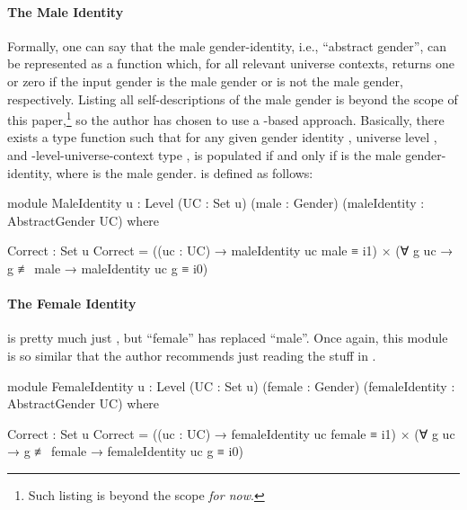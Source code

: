 \documentclass{article}
\theoremstyle{remark}
\begin{document}
\paragraph{The Male Identity}\label{sec:gender8exampleIdentityMale}
Formally, one can say that the male gender-identity, i.e., ``abstract gender'', can be represented as a function which, for all relevant universe contexts, returns one or zero if the input gender is the male gender or is not the male gender, respectively.  Listing all self-descriptions of the male gender is beyond the scope of this paper,\footnote{Such listing is beyond the scope \emph{for now}.} so the author has chosen to use a -based approach.  Basically, there exists a type function  such that for any given gender identity , universe level , and -level-universe-context type ,     is populated if and only if  is the male gender-identity, where  is the male gender.   is defined as follows:

\begin{code}
    module MaleIdentity
           {u : Level}
           (UC : Set u)
           (male : Gender)
           (maleIdentity : AbstractGender UC) where

      Correct : Set u
      Correct = ((uc : UC) → maleIdentity uc male ≡ i1)
              × (∀ g uc → g ≢ male → maleIdentity uc g ≡ i0)
\end{code}

\paragraph{The Female Identity}\label{sec:gender8exampleIdentityFemale}
 is pretty much just , but ``female'' has replaced ``male''.  Once again, this module is so similar that the author recommends just reading the stuff in .

\begin{code}
    module FemaleIdentity
           {u : Level}
           (UC : Set u)
           (female : Gender)
           (femaleIdentity : AbstractGender UC) where

      Correct : Set u
      Correct = ((uc : UC) → femaleIdentity uc female ≡ i1)
              × (∀ g uc → g ≢ female → femaleIdentity uc g ≡ i0)
\end{code}
\end{document}
